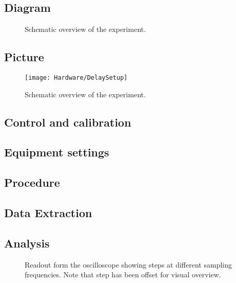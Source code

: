\subsection{Diagram}

\begin{figure}[H]
	\centering
	
	\caption{Schematic overview of the experiment.}
	\label{fig:SchematicDelayExperiment}
\end{figure}

\subsection{Picture}

\begin{figure}[H]
	\centering
\texttt{[image: Hardware/DelaySetup]}
	\caption{Schematic overview of the experiment.}
	\label{fig:DelayExperimentSetu}
\end{figure}


\subsection{Control and calibration}

\subsection{Equipment settings}



\subsection{Procedure}

\subsection{Data Extraction}

\subsection{Analysis}

\begin{figure}[H]
	\centering
	
	\caption{Readout form the oscilloscope showing steps at different sampling frequencies. Note that step has been offset for visual overview.}
	\label{fig:SchematicDelayExperiment}
\end{figure}


